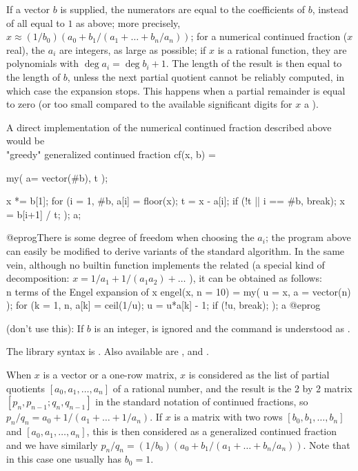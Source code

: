 If a vector $b$ is supplied, the numerators are equal to the coefficients
of $b$, instead of all equal to $1$ as above; more precisely, $x \approx
(1/b_0)(a_0+b_1/(a_1+\dots+b_n/a_n))$; for a numerical continued fraction
($x$ real), the $a_i$ are integers, as large as possible; if $x$ is a
rational function, they are polynomials with $\deg a_i = \deg b_i + 1$.
The length of the result is then equal to the length of $b$, unless the next
partial quotient cannot be reliably computed, in which case the expansion
stops. This happens when a partial remainder is equal to zero (or too small
compared to the available significant digits for $x$ a ).

A direct implementation of the numerical continued fraction
 described above would be
\bprog
\\ "greedy" generalized continued fraction
cf(x, b) =
{ my( a= vector(#b), t );

  x *= b[1];
  for (i = 1, #b,
    a[i] = floor(x);
    t = x - a[i]; if (!t || i == #b, break);
    x = b[i+1] / t;
  ); a;
}
@eprog\noindent There is some degree of freedom when choosing the $a_i$; the
program above can easily be modified to derive variants of the standard
algorithm. In the same vein, although no builtin
function implements the related  (a special kind of
 decomposition: $x = 1/a_1 + 1/(a_1a_2) + \dots$ ),
it can be obtained as follows:
\bprog
\\ n terms of the Engel expansion of x
engel(x, n = 10) =
{ my( u = x, a = vector(n) );
  for (k = 1, n,
    a[k] = ceil(1/u);
    u = u*a[k] - 1;
    if (!u, break);
  ); a
}
@eprog

 (don't use this): If $b$ is an integer, 
is ignored and the command is understood as .

The library syntax is .
Also available are ,
 and .

\label{se:contfracpnqn}
When $x$ is a vector or a one-row matrix, $x$
is considered as the list of partial quotients $[a_0,a_1,\dots,a_n]$ of a
rational number, and the result is the 2 by 2 matrix
$[p_n,p_{n-1};q_n,q_{n-1}]$ in the standard notation of continued fractions,
so $p_n/q_n=a_0+1/(a_1+\dots+1/a_n)$. If $x$ is a matrix with two rows
$[b_0,b_1,\dots,b_n]$ and $[a_0,a_1,\dots,a_n]$, this is then considered as a
generalized continued fraction and we have similarly
$p_n/q_n=(1/b_0)(a_0+b_1/(a_1+\dots+b_n/a_n))$. Note that in this case one
usually has $b_0=1$.

